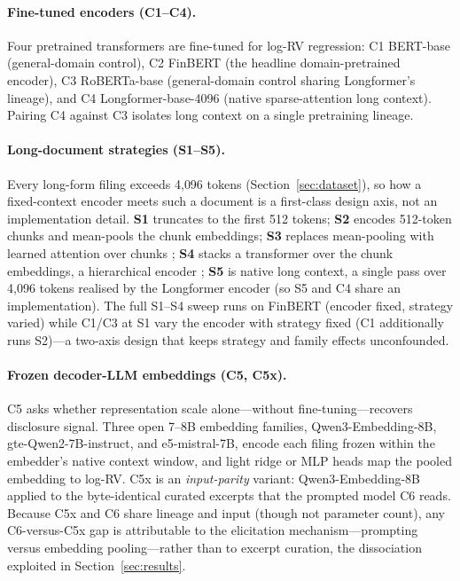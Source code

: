 \paragraph{Fine-tuned encoders (C1--C4).}
Four pretrained transformers are fine-tuned for log-RV regression: C1 BERT-base \citep{devlin2019bert} (general-domain control), C2 FinBERT \citep{araci2019finbert} (the headline domain-pretrained encoder), C3 RoBERTa-base \citep{liu2019roberta} (general-domain control sharing Longformer's lineage), and C4 Longformer-base-4096 \citep{beltagy2020longformer} (native sparse-attention long context). Pairing C4 against C3 isolates long context on a single pretraining lineage.

\paragraph{Long-document strategies (S1--S5).}
Every long-form filing exceeds 4{,}096 tokens (Section~\ref{sec:dataset}), so how a fixed-context encoder meets such a document is a first-class design axis, not an implementation detail. \textbf{S1} truncates to the first 512 tokens; \textbf{S2} encodes 512-token chunks and mean-pools the chunk embeddings; \textbf{S3} replaces mean-pooling with learned attention over chunks \citep{vaswani2017attention}; \textbf{S4} stacks a transformer over the chunk embeddings, a hierarchical encoder \citep{pappagari2019hierarchical}; \textbf{S5} is native long context, a single pass over 4{,}096 tokens realised by the Longformer encoder (so S5 and C4 share an implementation). The full S1--S4 sweep runs on FinBERT (encoder fixed, strategy varied) while C1/C3 at S1 vary the encoder with strategy fixed (C1 additionally runs S2)---a two-axis design that keeps strategy and family effects unconfounded.

\paragraph{Frozen decoder-LLM embeddings (C5, C5x).}
C5 asks whether representation scale alone---without fine-tuning---recovers disclosure signal. Three open 7--8B embedding families, Qwen3-Embedding-8B, gte-Qwen2-7B-instruct, and e5-mistral-7B, encode each filing frozen within the embedder's native context window, and light ridge or MLP heads map the pooled embedding to log-RV. C5x is an \emph{input-parity} variant: Qwen3-Embedding-8B applied to the byte-identical curated excerpts that the prompted model C6 reads. Because C5x and C6 share lineage and input (though not parameter count), any C6-versus-C5x gap is attributable to the elicitation mechanism---prompting versus embedding pooling---rather than to excerpt curation, the dissociation exploited in Section~\ref{sec:results}.

